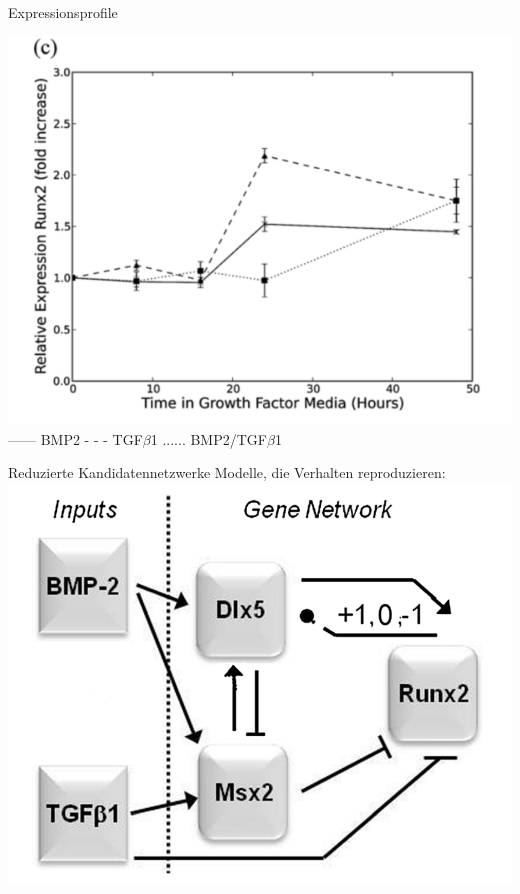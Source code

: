 \documentclass[]{beamer}
\begin{document}
\begin{frame}{Expressionsprofile}
\begin{center}
			\includegraphics[scale=0.18]{Expression_Runx2.jpg}
	\\------ BMP2 - - - TGF$\beta$1 ...... BMP2/TGF$\beta$1
\end{center}
\end{frame}

\begin{frame}{Reduzierte Kandidatennetzwerke}
Modelle, die Verhalten reproduzieren:
	\includegraphics[scale=0.22]{regulatory_network_results.jpg}
\end{frame}
\end{document}
